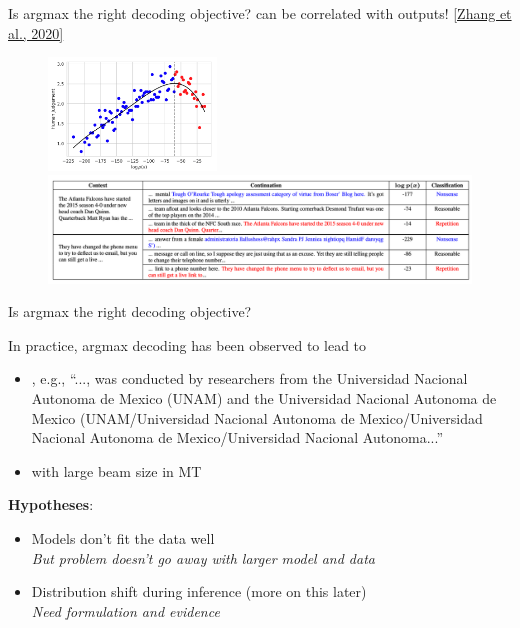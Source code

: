 \documentclass[usenames,dvipsnames,notes,11pt,aspectratio=169,hyperref={colorlinks=true, linkcolor=blue}]{beamer}
\begin{document}
\begin{frame}
    {Is argmax the right decoding objective?}
     can be correlated with  outputs! \href{https://arxiv.org/abs/2004.10450}{[Zhang et al., 2020]}
    \begin{figure}
        \includegraphics[height=3cm]{figures/likelihood-trap}\\
        \includegraphics[width=\textwidth]{figures/likelihood-trap-ex}
    \end{figure}
\end{frame}

\begin{frame}
    {Is argmax the right decoding objective?}

    In practice, argmax decoding has been observed to lead to\\
    \begin{itemize}
        \item {}, e.g., 
            {\small
                ``..., was conducted by researchers from the Universidad Nacional Autonoma de Mexico (UNAM) and {the Universidad Nacional Autonoma de Mexico (UNAM/Universidad Nacional Autonoma de Mexico/Universidad Nacional Autonoma de Mexico/Universidad Nacional Autonoma...}''}
            \item {} with large beam size in MT
    \end{itemize}

    \pause
    {\bf Hypotheses}:\\
    \begin{itemize}
        \item Models don't fit the data well \\
            {\em But problem doesn't go away with larger model and data}
        \item Distribution shift during inference (more on this later)\\
            {\em Need formulation and evidence}
    \end{itemize}
\end{frame}
\end{document}
